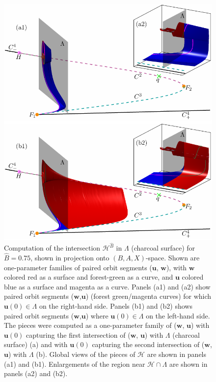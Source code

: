\documentclass{ws-ijbc}
\begin{document}
\begin{figure}[H]
\centering
\includegraphics[]{./figures/MKMO_19.pdf}
\caption{Computation of the intersection $\mathscr{H}^{\widehat{B}}$ in $\Lambda$ (charcoal surface) for $\widehat{B}=0.75$, shown in projection onto $(B, A, X)$-space.  Shown are one-parameter families of paired orbit segments ($\mathbf{u}$, $\mathbf{w}$), with $\mathbf{w}$ colored red as a surface and forest-green as a curve, and $\mathbf{u}$ colored blue as a surface and magenta as a curve.  Panels (a1) and (a2) show paired orbit segments ($\mathbf{w}$,$\mathbf{u}$) (forest green/magenta curves) for which $\mathbf{u}(0) \in \Lambda$ on the right-hand side.  Panels (b1) and (b2) shows paired orbit segments ($\mathbf{w}$,$\mathbf{u}$) where $\mathbf{u}(0) \in \Lambda$ on the left-hand side.  The pieces were computed as a one-parameter family of ($\mathbf{w}$, $\mathbf{u}$) with $\mathbf{u}(0)$ capturing the first intersection of ($\mathbf{w}$, $\mathbf{u}$) with $\Lambda$ (charcoal surface) (a) and with $\mathbf{u}(0)$ capturing the second intersection of ($\mathbf{w}$, $\mathbf{u}$) with $\Lambda$ (b).  Global views of the pieces of $\mathscr{H}$ are shown in panels (a1) and (b1).  Enlargements of the region near $\mathscr{H} \cap \Lambda$ are shown in panels (a2) and (b2).}
\label{figure_19}
\end{figure}
\end{document}
